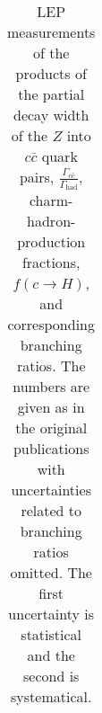 {\begin{table}[hbpt]
\begin{tabular}{|c|c|c|c|}
\end{tabular}
\caption{LEP measurements of the products of the partial decay width of 
the $Z$ into $c\bar{c}$ quark pairs, $\frac{\Gamma_{c\bar c}}{\Gamma_{\text{had}}}$, charm-hadron-production fractions,
 $f(c \rightarrow H)$, and corresponding branching ratios. 
 The numbers are given as in the original publications with
uncertainties related to branching ratios omitted.
 The first uncertainty is statistical and the second is systematical.
 }
\label{tab:EEZmeas}
\end{table}
}




\newcommand{\tabEEZaverage}{
\begin{table}[htbp]\small\centering
\begin{tabular}{|c|c|c|}\hline
&Fixed $\frac{\Gamma_{cc}}{\Gamma_{\text{hadrons}}}$& Constrained $S$\\\hline\hline

\end{tabular}
\caption{Average of charm-quark fragmentation fractions into hadrons in  $Z$ decays.
 The quantities $S$, $R_{u/d}$, $P^d_{V}$ and 
$\gamma_s$ are recalculated from the fit results taking into account correlation of fit parameters.
The value of minimized $\chi^2$  and the number degrees of freedom of the fit $n_{\text{dof}}$ are given as well.}
\label{tab:EEZaverage}
\end{table}
}






